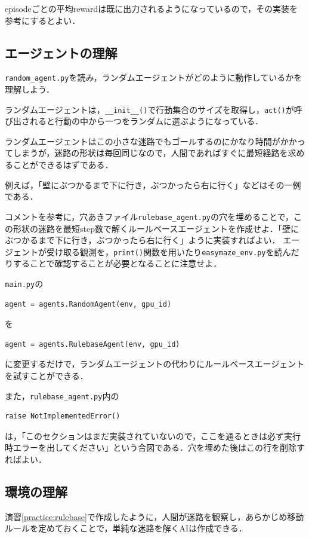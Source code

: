   episodeごとの平均rewardは既に出力されるようになっているので，その実装を参考にするとよい．

  \subsection{エージェントの理解}
  \label{subsec:rulebase}
  \verb+random_agent.py+を読み，ランダムエージェントがどのように動作しているかを理解しよう．

  ランダムエージェントは，\verb+__init__()+で行動集合のサイズを取得し，\verb+act()+が呼び出されると行動の中から一つをランダムに選ぶようになっている．

  ランダムエージェントはこの小さな迷路でもゴールするのにかなり時間がかかってしまうが，迷路の形状は毎回同じなので，人間であればすぐに最短経路を求めることができるはずである．

  例えば，「壁にぶつかるまで下に行き，ぶつかったら右に行く」などはその一例である．

  \begin{practice}
   \label{practice:rulebase}
   コメントを参考に，穴あきファイル\verb+rulebase_agent.py+の穴を埋めることで，この形状の迷路を最短step数で解くルールベースエージェントを作成せよ．「壁にぶつかるまで下に行き，ぶつかったら右に行く」ように実装すればよい．
   エージェントが受け取る観測を，\verb+print()+関数を用いたり\verb+easymaze_env.py+を読んだりすることで確認することが必要となることに注意せよ．
  \end{practice}

  \verb+main.py+の
  \begin{lstlisting}[basicstyle=\ttfamily\footnotesize, frame=single]
   agent = agents.RandomAgent(env, gpu_id)
  \end{lstlisting}
  を
  \begin{lstlisting}[basicstyle=\ttfamily\footnotesize, frame=single]
   agent = agents.RulebaseAgent(env, gpu_id)
  \end{lstlisting}
  に変更するだけで，ランダムエージェントの代わりにルールベースエージェントを試すことができる．

  また，\verb+rulebase_agent.py+内の
  \begin{lstlisting}[basicstyle=\ttfamily\footnotesize, frame=single]
   raise NotImplementedError()
  \end{lstlisting}
  は，「このセクションはまだ実装されていないので，ここを通るときは必ず実行時エラーを出してください」という合図である．穴を埋めた後はこの行を削除すればよい．


  \subsection{環境の理解}
  演習\ref{practice:rulebase}で作成したように，人間が迷路を観察し，あらかじめ移動ルールを定めておくことで，単純な迷路を解くAIは作成できる．

